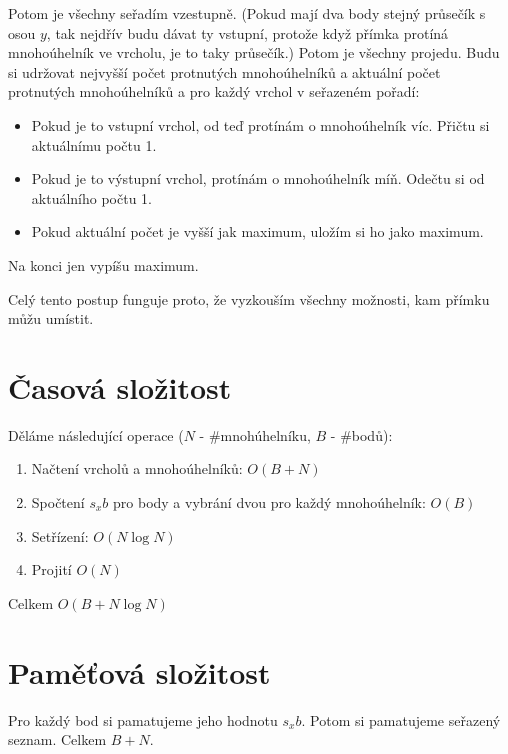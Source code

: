 \documentclass{article}
\begin{document}
Potom je všechny seřadím vzestupně. (Pokud mají dva body stejný průsečík s osou \(y\), tak nejdřív budu dávat ty vstupní, protože když přímka
protíná mnohoúhelník ve vrcholu, je to taky průsečík.) Potom je všechny projedu. Budu si udržovat nejvyšší počet protnutých mnohoúhelníků
a aktuální počet protnutých mnohoúhelníků a pro každý vrchol v seřazeném pořadí:
\begin{itemize}
    \item Pokud je to vstupní vrchol, od teď protínám o mnohoúhelník víc. Přičtu si aktuálnímu počtu 1.
    \item Pokud je to výstupní vrchol, protínám o mnohoúhelník míň. Odečtu si od aktuálního počtu 1.
    \item Pokud aktuální počet je vyšší jak maximum, uložím si ho jako maximum.
\end{itemize}
Na konci jen vypíšu maximum.

Celý tento postup funguje proto, že vyzkouším všechny možnosti, kam přímku můžu umístit.

\section*{Časová složitost}
Děláme následující operace (\(N\) - \#mnohúhelníku, \(B\) - \#bodů):
\begin{enumerate}
    \item Načtení vrcholů a mnohoúhelníků: \(O(B+N)\)
    \item Spočtení \(s_x b\) pro body a vybrání dvou pro každý mnohoúhelník: \(O(B)\)
    \item Setřízení: \(O(N \log N)\)
    \item Projití \(O(N)\)
\end{enumerate}
Celkem \(O(B + N \log N)\)

\section*{Paměťová složitost}
Pro každý bod si pamatujeme jeho hodnotu \(s_x b\). Potom si pamatujeme seřazený seznam. Celkem \(B + N\).
\end{document}
